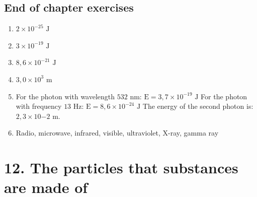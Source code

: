 \subsection{End of chapter exercises} 
\begin{multicols}{2}
\begin{enumerate}[itemsep=20pt, label=\textbf{\arabic*}.]
\item $2 \times 10^{-25} \text{ J}$
\item $3 \times 10^{-19} \text{ J}$
\item $8,6 \times 10^{-21} \text{ J}$
\item $3,0 \times 10^{3} \text{ m}$
\item For the photon with wavelength $532 \text{ nm}$: $\text{E}=3,7 \times 10^{-19} \text{ J}$ \newline
For the photon with frequency $13 \text{ Hz}$: $\text{E}=8,6 \times 10^{-24} \text{ J}$ \newline
The energy of the second photon is: $2,3 \times 10{-2} \text{ m}$.
\item Radio, microwave, infrared, visible, ultraviolet, X-ray, gamma ray
\end{enumerate}
\end{multicols}

\section {12. The particles that substances are made of}

